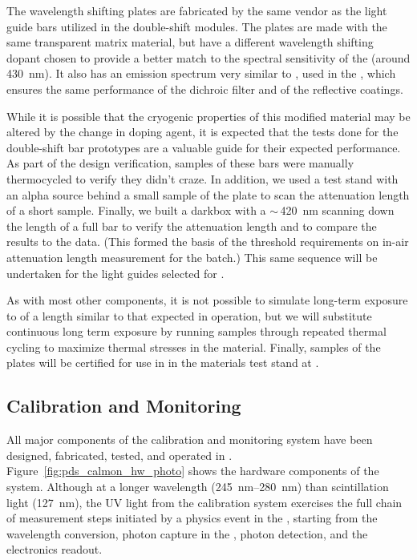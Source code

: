 The  wavelength shifting plates are fabricated by the same vendor as the light guide bars utilized in the double-shift  modules.  The plates are made with the same transparent matrix material, but have a different wavelength shifting dopant chosen to provide a better match to the spectral sensitivity of the   (around \SI{430}{nm}). It also has an emission spectrum very similar to , used in the , which ensures the same performance of the dichroic filter and of the reflective coatings.

While it is possible that the cryogenic properties of this modified  material may be altered by the change in doping agent, it is expected that the tests done for the double-shift bar prototypes are a valuable guide for their expected performance.  As part of the design verification, samples of these bars were manually thermocycled to verify they didn't craze. In addition, we used a  test stand 
with an alpha source behind a small sample of the  plate to scan the attenuation length of a short sample. Finally, we built a darkbox with a $\sim\,$\SI{420}{nm}  scanning down the length of a full bar to verify the attenuation length and to compare the results to the  data. (This formed the basis of the threshold requirements on in-air attenuation length measurement for the  batch.) 
This same sequence will be undertaken for the light guides selected for . 

As with most other components, it is not possible to simulate long-term exposure to  of a length similar to that expected in  operation, but we will substitute continuous long term exposure by running samples through repeated thermal cycling to maximize thermal stresses in the material.  Finally, samples of the  plates will be certified for use in  in the materials test stand at .  


\subsection{Calibration and Monitoring}
\label{sec:fdsp-pd-validation-candm}

All major components of the   calibration and monitoring system have been designed, fabricated, tested, and operated in . Figure~\ref{fig:pds_calmon_hw_photo} shows the hardware components of the system.
Although at a longer wavelength (\SIrange{245}{280}{nm}) than  scintillation light (\SI{127}{nm}), the UV light from the calibration system exercises the full chain of measurement steps initiated by a physics event in the , starting from the wavelength conversion, photon capture in the , photon detection, and the  electronics readout.

